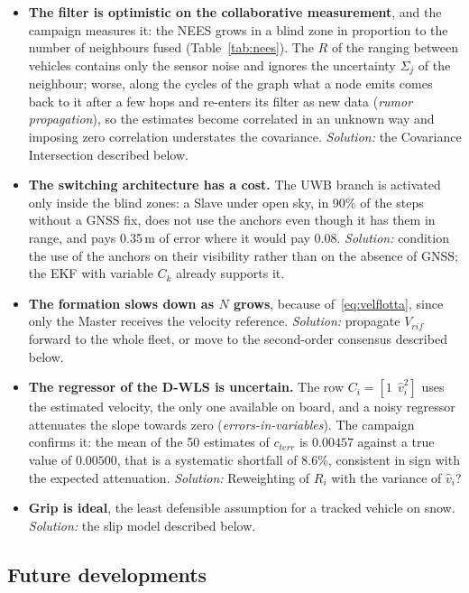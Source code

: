 \documentclass[conference,9pt]{IEEEtran}
\begin{document}
\begin{itemize}
\item \textbf{The filter is optimistic on the collaborative measurement}, and
      the campaign measures it: the NEES grows in a blind zone in proportion to
      the number of neighbours fused (Table~\ref{tab:nees}). The $R$ of the
      ranging between vehicles contains only the sensor noise and ignores the
      uncertainty $\Sigma_j$ of the neighbour; worse, along the cycles of the
      graph what a node emits comes back to it after a few hops and re-enters
      its filter as new data (\emph{rumor propagation}), so the estimates
      become correlated in an unknown way and imposing zero correlation
      understates the covariance. \emph{Solution:} the Covariance
      Intersection described below.
\item \textbf{The switching architecture has a cost.} The UWB branch is
      activated only inside the blind zones: a Slave under open sky, in 90\% of
      the steps without a GNSS fix, does not use the anchors even though it has
      them in range, and pays 0.35\,m of error where it would pay 0.08.
      \emph{Solution:} condition the use of the anchors on their visibility
      rather than on the absence of GNSS; the EKF with variable $C_k$ already
      supports it.
\item \textbf{The formation slows down as $N$ grows}, because
      of~\eqref{eq:velflotta}, since only the Master receives the velocity
      reference. \emph{Solution:} propagate $V_{rif}$ forward to the whole
      fleet, or move to the second-order consensus described below.
\item \textbf{The regressor of the D-WLS is uncertain.} The row
      $C_i = [1\ \ \hat v_i^2]$ uses the estimated velocity, the only one
      available on board, and a noisy regressor attenuates the slope towards
      zero (\emph{errors-in-variables}). The campaign confirms it: the mean of
      the 50 estimates of $c_{terr}$ is $0.00457$ against a true value of
      $0.00500$, that is a systematic shortfall of 8.6\%, consistent in sign
      with the expected attenuation.
      \emph{Solution:} Reweighting of $R_i$ with the variance of $\hat v_i$?
\item \textbf{Grip is ideal}, the least defensible assumption for a tracked
      vehicle on snow. \emph{Solution:} the slip model described below.
\end{itemize}

\subsection{Future developments}
\end{document}

